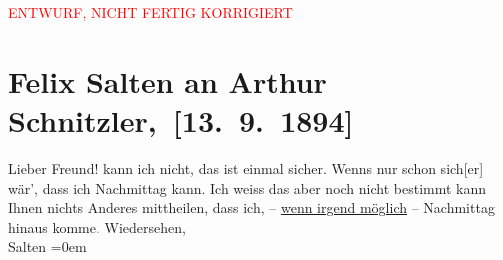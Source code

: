 
\begin{center}
            \textcolor{red}{ENTWURF, NICHT FERTIG KORRIGIERT}
                      \end{center}
            
         
         \renewcommand{\erwaehntePersonen}{Personen: Felix Salten}
         \renewcommand{\erwaehnteOrte}{Orte: Wien}
         \renewcommand{\erwaehnteWerke}{}
               \section[ Felix Salten an Arthur Schnitzler, {[}13. 9. 1894{]}]{ Felix Salten an Arthur Schnitzler, {[}13. 9. 1894{]}}\nopagebreak{}\rehead{ }\begin{ledgroupsized}[t]{13cm}\normalsize\beginnumbering \toendnotes[C]{\smallbreak\pagebreak[2]} 
\toendnotes[C]{\smallbreak}\pstart{}{\pb}Lieber Freund!\pend\pstart
           \label{K_L03146-1v}\label{K_L03146-1h} kann ich nicht, das
               ist einmal sicher. Wenns nur schon sich{[}er{]} wär’, dass ich
                  Nachmittag kann. Ich weiss das aber noch nicht bestimmt {\kaufmannsund} kann Ihnen nichts {\pb}Anderes mittheilen, dass ich, –
                  \uline{wenn irgend möglich} – Nachmittag
               hinaus komme\textcolor{gray}{.}\pend
           \pstart
           Wiedersehen, {\\[\baselineskip]}\spacefill\mbox{Salten}\pend
           \leftskip=0em{}
         
         \endnumbering{}\end{ledgroupsized}  \newcommand{\dateiname}{L03146}\newcommand{\titel}{Felix Salten an Arthur Schnitzler, [13. 9. 1894]}\newcommand{\editorInnen}{Martin Anton Müller und Laura Untner}
      